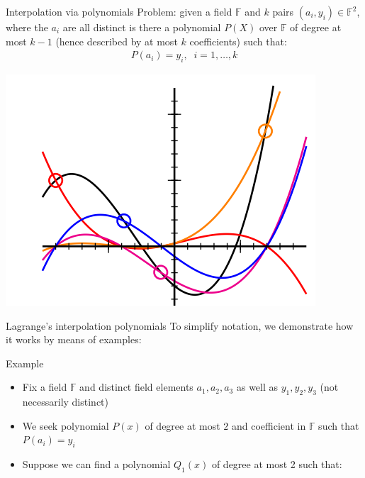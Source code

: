\begin{parag}{Interpolation via polynomials}
    Problem: given a field $\mathbb{F}$ and $k$ pairs $\left(a_i, y_i\right) \in \mathbb{F}^2$, where the $a_i$ are all distinct is there a polynomial $P\left(X\right)$ over $\mathbb{F}$ of degree at most $k-1$ (hence described by at most $k$ coefficients) such that:
    \begin{align*} 
        P\left(a_i\right) =  y_i, \;\; i =  1, \ldots, k
    \end{align*}
    \begin{center}
        \includegraphics[scale=0.8]{32025-05-21.png}
    \end{center}
    
\end{parag}
\begin{parag}{Lagrange's interpolation polynomials}
   To simplify notation, we demonstrate how it works by means of examples:
   \begin{subparag}{Example}
       \begin{itemize}
           \item Fix a field $\mathbb{F}$ and distinct field elements $a_1, a_2, a_3$ as well as $y_1, y_2, y_3$ (not necessarily distinct)
           \item We seek polynomial $P\left(x\right)$ of degree at most $2$ and coefficient in $\mathbb{F}$ such that $P\left(a_i\right) =  y_i$
           \item Suppose we can find a polynomial $Q_1\left(x\right)$ of degree at most 2 such that:
       \end{itemize}
       
   \end{subparag}
\end{parag}

